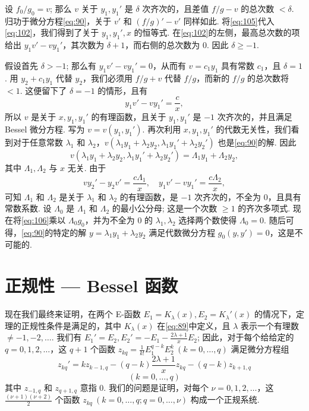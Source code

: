 设 $f_0/g_0 = v$; 那么 $v$ 关于 $y_1, y_1'$ 是 $\delta$ 次齐次的，且差值 $f/g - v$ 的总次数 $< \delta$. 归功于微分方程\eqref{eq:90}，关于 $v'$ 和 $(f/g)' - v'$ 同样如此. 将\eqref{eq:105}代入\eqref{eq:102}，我们得到了关于 $y_1, y_1', x$ 的恒等式. 在\eqref{eq:102}的左侧，最高总次数的项给出 $y_1 v' - v y_1'$，其次数为 $\delta + 1$，而右侧的总次数为 0. 因此 $\delta \ge -1$.

假设首先 $\delta > -1$; 那么有 $y_1 v' - v y_1' = 0$，从而有 $v = c_1 y_1$ 具有常数 $c_1$，且 $\delta = 1$. 用 $y_2 + c_1 y_1$ 代替 $y_2$，我们必须用 $f/g + v$ 代替 $f/g$，而新的 $f/g$ 的总次数将 $< 1$. 这便留下了 $\delta = -1$ 的情形，且有
\[y_1 v' - v y_1' = \frac{c}{x},\]
所以 $v$ 是关于 $x, y_1, y_1'$ 的有理函数，且关于 $y_1, y_1'$ 是 $-1$ 次齐次的，并且满足 Bessel 微分方程. 写为 $v = v(y_1, y_1')$. 再次利用 $x, y_1, y_1'$ 的代数无关性，我们看到对于任意常数 $\lambda_1$ 和 $\lambda_2$，$v(\lambda_1 y_1 + \lambda_2 y_2, \lambda_1 y_1' + \lambda_2 y_2')$ 也是\eqref{eq:90}的解. 因此
\begin{equation}
v(\lambda_1 y_1 + \lambda_2 y_2, \lambda_1 y_1' + \lambda_2 y_2') = \Lambda_1 y_1 + \Lambda_2 y_2, \tag{106}\label{eq:106}
\end{equation}
其中 $\Lambda_1, \Lambda_2$ 与 $x$ 无关. 由于
\[v y_2' - y_2 v' = \frac{c \Lambda_1}{x}, \quad y_1 v' - v y_1' = \frac{c \Lambda_2}{x},\]
可知 $\Lambda_1$ 和 $\Lambda_2$ 是关于 $\lambda_1$ 和 $\lambda_2$ 的有理函数，是 $-1$ 次齐次的，不全为 0，且具有常数系数. 设 $\Lambda_0$ 是 $\Lambda_1$ 和 $\Lambda_2$ 的最小公分母; 这是一个次数 $\ge 1$ 的齐次多项式. 现在将\eqref{eq:106}乘以 $\Lambda_0 g_0$，并为不全为 0 的 $\lambda_1, \lambda_2$ 选择两个数使得 $\Lambda_0 = 0$. 随后可得，\eqref{eq:90}的特定的解 $y = \lambda_1 y_1 + \lambda_2 y_2$ 满足代数微分方程 $g_0(y, y') = 0$，这是不可能的.

\section{正规性 --- Bessel 函数}

现在我们最终来证明，在两个 E-函数 $E_1 = K_\lambda(x), E_2 = K_\lambda'(x)$ 的情况下，定理的正规性条件是满足的，其中 $K_\lambda(x)$ 在\eqref{eq:89}中定义，且 $\lambda$ 表示一个有理数 $\neq -1, -2, \dots$. 我们有 $E_1' = E_2, E_2' = -E_1 - \frac{2\lambda+1}{x} E_2$; 因此，对于每个给给定的 $q=0,1,2,\dots$，这 $q+1$ 个函数 $z_{kq} = \frac{1}{k!} E_1^{q-k} E_2^k \ (k=0,\dots,q)$ 满足微分方程组
\begin{equation}
z_{kq}' = k z_{k-1, q} - (q-k) \frac{2\lambda+1}{x} z_{kq} - (q-k) z_{k+1, q} \tag{107}\label{eq:107}
\end{equation}
\[(k=0,\dots,q)\]
其中 $z_{-1, q}$ 和 $z_{q+1, q}$ 意指 $0$. 我们的问题是证明，对每个 $\nu=0,1,2,\dots$，这 $\frac{(\nu+1)(\nu+2)}{2}$ 个函数 $z_{kq} \ (k=0,\dots,q; q=0,\dots,\nu)$ 构成一个正规系统.

